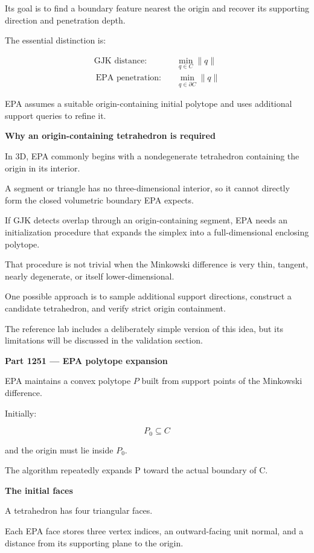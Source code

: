 Its goal is to find a boundary feature nearest the origin and recover its supporting direction and penetration depth.

The essential distinction is:

\[
\boxed{ \begin{aligned} \text{GJK distance:}&\quad \min_{q\in C}\|q\|\\\ \text{EPA penetration:}&\quad \min_{q\in\partial C}\|q\| \end{aligned} }
\]

EPA assumes a suitable origin-containing initial polytope and uses additional support queries to refine it.

\textbf{Why an origin-containing tetrahedron is required}

In 3D, EPA commonly begins with a nondegenerate tetrahedron containing the origin in its interior.

A segment or triangle has no three-dimensional interior, so it cannot directly form the closed volumetric boundary EPA expects.

If GJK detects overlap through an origin-containing segment, EPA needs an initialization procedure that expands the simplex into a full-dimensional enclosing polytope.

That procedure is not trivial when the Minkowski difference is very thin, tangent, nearly degenerate, or itself lower-dimensional.

One possible approach is to sample additional support directions, construct a candidate tetrahedron, and verify strict origin containment.

The reference lab includes a deliberately simple version of this idea, but its limitations will be discussed in the validation section.

\textbf{Part 1251 --- EPA polytope expansion}

EPA maintains a convex polytope \(P\) built from support points of the Minkowski difference.

Initially:

\[
P_0\subseteq C
\]

and the origin must lie inside \(P_0\).

The algorithm repeatedly expands P toward the actual boundary of C.

\textbf{The initial faces}

A tetrahedron has four triangular faces.

Each EPA face stores three vertex indices, an outward-facing unit normal, and a distance from its supporting plane to the origin.

